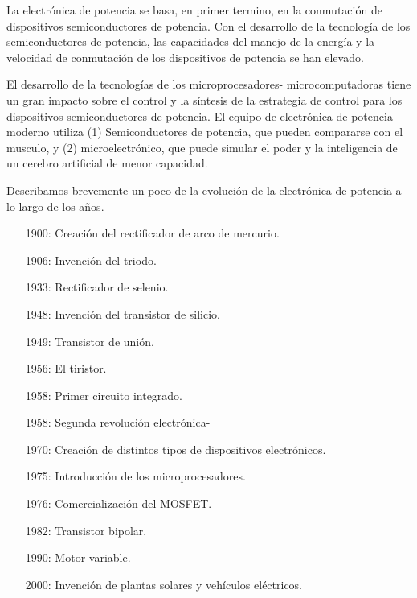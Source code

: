\documentclass[12pt,letterpaper,superscriptaddress]{article}
\begin{document}
La electrónica de potencia se basa, en primer termino, en la conmutación de dispositivos semiconductores de potencia. Con el desarrollo de la tecnología de los semiconductores de potencia, las capacidades del manejo de la energía y la velocidad de conmutación de los dispositivos de potencia se han elevado.

El desarrollo de la tecnologías de los microprocesadores- microcomputadoras tiene un gran impacto sobre el control y la síntesis de la estrategia de control para los dispositivos semiconductores de potencia. El equipo de electrónica de potencia moderno utiliza (1) Semiconductores de potencia, que pueden compararse con el musculo, y (2) microelectrónico, que puede simular el poder y la inteligencia de un cerebro artificial de menor capacidad.

Describamos brevemente un poco de la evolución de la electrónica de potencia a lo largo de los años.

\begin{enumerate}
	\item[1900:] Creación del rectificador de arco de mercurio.
	
	\item[1906:] Invención del triodo.
	
	\item[1933:] Rectificador de selenio.
	
	\item[1948:] Invención del transistor de silicio.
	
	\item[1949:] Transistor de unión.
	
	\item[1956:] El tiristor.
	
	\item[1958:] Primer circuito integrado.
	
	\item[1958:] Segunda revolución electrónica-
	
	\item[1970:] Creación de distintos tipos de dispositivos electrónicos.
	
	\item[1975:] Introducción de los microprocesadores.
	
	\item[1976:] Comercialización del MOSFET.
	
	\item[1982:] Transistor bipolar.
	
	\item[1990:] Motor variable.
	
	\item[2000:] Invención de plantas solares y vehículos eléctricos.
\end{enumerate}
\end{document}

